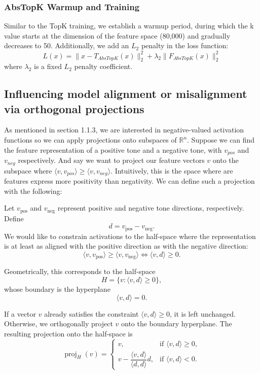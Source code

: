 \documentclass{article}
\begin{document}
\subsubsection{AbsTopK Warmup and Training}
    Similar to the TopK training, we establish a warmup period, during which the k value starts at the dimension of the feature space (80,000) and gradually decreases to 50. Additionally, we add an $L_2$ penalty in the loss function:
    $$
    L(x) = \|x - T_{AbsTopK}(x)\|_2^2 + \lambda_2 \|F_{AbsTopK}(x)\|_2^2
    $$
    where $\lambda_2$ is a fixed $L_2$ penalty coefficient.

\subsection{Influencing model alignment or misalignment via orthogonal projections}
As mentioned in section 1.1.3, we are interested in negative-valued activation functions so we can apply projections onto subspaces of $\mathbb{R}^n$. Suppose we can find the feature representation of a positive tone and a negative tone, with $v_{pos}$ and $v_{neg}$ respectively. And say we want to project our feature vectors $v$ onto the subspace where $\langle v, v_{pos}\rangle \geq \langle v, v_{neg}\rangle$. Intuitively, this is the space where are features express more positivity than negativity. We can define such a projection with the following:



Let \(v_{\text{pos}}\) and \(v_{\text{neg}}\) represent positive and negative tone directions, respectively. Define
\[
d = v_{\text{pos}} - v_{\text{neg}}.
\]
We would like to constrain activations to the half-space where the representation is at least as aligned with the positive direction as with the negative direction:
\[
\langle v, v_{\text{pos}} \rangle
\ge
\langle v, v_{\text{neg}} \rangle
\iff
\langle v, d \rangle \ge 0.
\]

Geometrically, this corresponds to the half-space
\[
H = \{v : \langle v, d \rangle \ge 0\},
\]
whose boundary is the hyperplane
\[
\langle v, d \rangle = 0.
\]

If a vector \(v\) already satisfies the constraint \(\langle v, d \rangle \ge 0\), it is left unchanged. Otherwise, we orthogonally project \(v\) onto the boundary hyperplane. The resulting projection onto the half-space is
\[
\operatorname{proj}_{H}(v)
=
\begin{cases}
v,
& \text{if } \langle v, d \rangle \ge 0, \\[8pt]
v - \dfrac{\langle v, d \rangle}{\langle d,d \rangle}d,
& \text{if } \langle v, d \rangle < 0.
\end{cases}
\]
\end{document}
